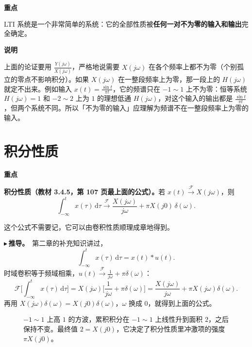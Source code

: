 \documentclass[UTF8,a4paper,11pt]{ctexart}
\newcommand{\dd}{\mathrm{d}}
\newcommand{\F}{\mathcal{F}}
\newenvironment{remember}{\begin{rememberbox}\textbf{重点}\par\smallskip}{\end{rememberbox}}
\newenvironment{note}{\begin{notebox}\textbf{说明}\par\smallskip}{\end{notebox}}
\newcommand{\taxes}[5][t]{%
  \draw[->] (#2,0) -- (#3,0) node[right,font=\scriptsize] {$#1$};
  \draw[->] (0,#5) -- (0,#4);
  \node[anchor=north east,font=\tiny,gray!60!black,inner sep=1pt] at (0,-0.02) {$0$};}
\newcommand{\xt}[2]{\draw (#1,0) -- (#1,-0.1) node[anchor=north,font=\tiny,gray!60!black,fill=white,inner sep=0.6pt] {$#2$};}
\newcommand{\yt}[2]{\draw (0,#1) -- (-0.1,#1) node[anchor=east,font=\tiny,gray!60!black,fill=white,inner sep=0.6pt] {$#2$};}
\newcommand{\rectp}[4][sig]{\draw[#1] (#2,0) -- (#2,#4) -- (#3,#4) -- (#3,0);}
\newcounter{ex}[section]
\newcommand{\point}[1]{\par\addvspace{1ex}\noindent\textcolor{ptteal}{$\blacktriangleright$\,\textbf{#1}}\ }
\begin{document}
\begin{remember}
LTI 系统是一个非常简单的系统：它的全部性质被\textbf{任何一对不为零的输入和输出}完全确定。
\end{remember}

\begin{note}
上面的论证要用 $\frac{Y(j\omega)}{X(j\omega)}$，严格地说需要 $X(j\omega)$ 在各个频率上都不为零（个别孤立的零点不影响积分）。如果 $X(j\omega)$ 在一整段频率上为零，那一段上的 $H(j\omega)$ 就定不出来。例如输入 $x(t)=\frac{\sin t}{\pi t}$，它的频谱只在 $-1\sim1$ 上不为零：恒等系统 $H(j\omega)=1$ 和 $-2\sim2$ 上为 $1$ 的理想低通 $H(j\omega)$，对这个输入的输出都是 $\frac{\sin t}{\pi t}$，但两个系统不同。所以「不为零的输入」应理解为频谱不在一整段频率上为零的输入。
\end{note}

\section{积分性质}\label{sec:int}
\begin{remember}
\textbf{积分性质（教材 3.4.5，第 107 页最上面的公式）。}若 $x(t)\xrightarrow{\F}X(j\omega)$，则
\[
\int_{-\infty}^{t}x(\tau)\,\dd\tau\xrightarrow{\F}\frac{X(j\omega)}{j\omega}+\pi X(j0)\,\delta(\omega).
\]
\end{remember}
这个公式不需要记，它可以由卷积性质顺理成章地得到。

\point{推导。}第二章的补充知识讲过，
\[
\int_{-\infty}^{t}x(\tau)\,\dd\tau=x(t)*u(t).
\]
时域卷积等于频域相乘，$u(t)\xrightarrow{\F}\frac1{j\omega}+\pi\delta(\omega)$：
\[
\F\Big[\int_{-\infty}^{t}x(\tau)\,\dd\tau\Big]=X(j\omega)\Big[\frac1{j\omega}+\pi\delta(\omega)\Big]
=\frac{X(j\omega)}{j\omega}+\pi X(j\omega)\delta(\omega).
\]
再用 $X(j\omega)\delta(\omega)=X(j0)\delta(\omega)$，$\omega$ 换成 $0$，就得到上面的公式。

\begin{figure}[H]
\centering
{}
\caption{$-1\sim1$ 上高 $1$ 的方波，累积积分在 $-1\sim1$ 上线性升到面积 $2$，之后保持不变。最终值 $2=X(j0)$，它决定了积分性质里冲激项的强度 $\pi X(j0)$。}
\label{fig:int}
\end{figure}
\end{document}
